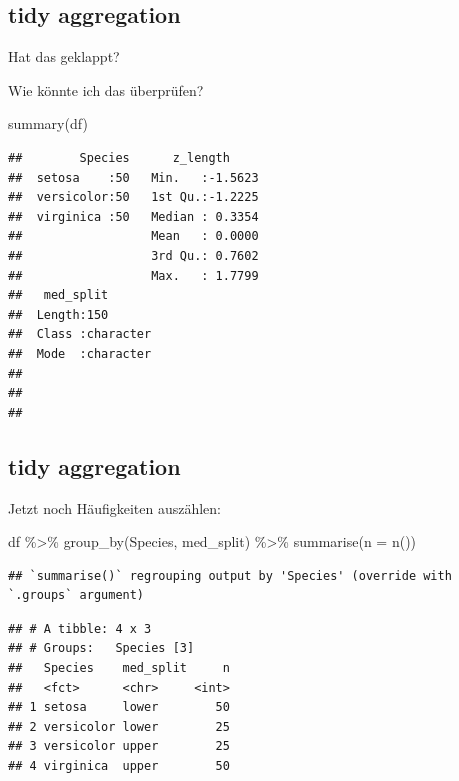 \documentclass[
]{book}
\newenvironment{Shaded}{\begin{snugshade}}{\end{snugshade}}
\newcommand{\AttributeTok}[1]{\textcolor[rgb]{0.77,0.63,0.00}{#1}}
\newcommand{\FunctionTok}[1]{\textcolor[rgb]{0.00,0.00,0.00}{#1}}
\newcommand{\NormalTok}[1]{#1}
\newcommand{\SpecialCharTok}[1]{\textcolor[rgb]{0.00,0.00,0.00}{#1}}
\begin{document}
\hypertarget{tidy-aggregation-4}{%
\subsection{tidy aggregation}\label{tidy-aggregation-4}}

Hat das geklappt?

Wie könnte ich das überprüfen?

\begin{Shaded}
\begin{Highlighting}[]
\FunctionTok{summary}\NormalTok{(df)}
\end{Highlighting}
\end{Shaded}

\begin{verbatim}
##        Species      z_length      
##  setosa    :50   Min.   :-1.5623  
##  versicolor:50   1st Qu.:-1.2225  
##  virginica :50   Median : 0.3354  
##                  Mean   : 0.0000  
##                  3rd Qu.: 0.7602  
##                  Max.   : 1.7799  
##   med_split        
##  Length:150        
##  Class :character  
##  Mode  :character  
##                    
##                    
## 
\end{verbatim}

\hypertarget{tidy-aggregation-5}{%
\subsection{tidy aggregation}\label{tidy-aggregation-5}}

Jetzt noch Häufigkeiten auszählen:

\begin{Shaded}
\begin{Highlighting}[]
\NormalTok{df }\SpecialCharTok{\%\textgreater{}\%} 
  \FunctionTok{group\_by}\NormalTok{(Species, med\_split) }\SpecialCharTok{\%\textgreater{}\%} 
  \FunctionTok{summarise}\NormalTok{(}\AttributeTok{n =} \FunctionTok{n}\NormalTok{())}
\end{Highlighting}
\end{Shaded}

\begin{verbatim}
## `summarise()` regrouping output by 'Species' (override with `.groups` argument)
\end{verbatim}

\begin{verbatim}
## # A tibble: 4 x 3
## # Groups:   Species [3]
##   Species    med_split     n
##   <fct>      <chr>     <int>
## 1 setosa     lower        50
## 2 versicolor lower        25
## 3 versicolor upper        25
## 4 virginica  upper        50
\end{verbatim}
\end{document}
